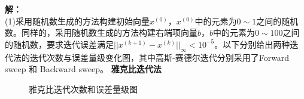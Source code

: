 \documentclass[a4paper,11pt,UTF8]{article}%
\theoremstyle{plain}
\begin{document}
	\textbf{解：}\\
	\indent(1)采用随机数生成的方法构建初始向量$x^{\left(0\right)}$，$x^{\left(0\right)}$中的元素为$0\sim{1}$之间的随机数。同样的，采用随机数生成的方法构建右端项向量$b$，$b$中的元素为$0\sim{100}$之间的随机数，要求迭代误差满足$||x^{\left(k+1\right)}-x^{\left(k\right)}||_{\infty}<10^{-5}$。以下分别给出两种迭代法的迭代次数与误差量级变化图，其中高斯-赛德尔迭代分别采用了Forward sweep 和 Backward sweep。
	\newpage
	\textbf{雅克比迭代法}
		\begin{figure}[!h]
		\centering
		\hfill
		\newline
		\hfill
		\caption{雅克比迭代次数和误差量级图}
	\end{figure}\\
\end{document}
